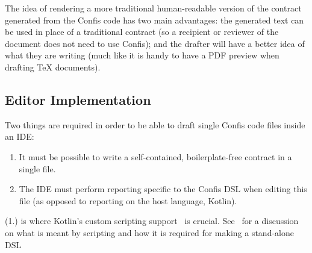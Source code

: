The idea of rendering a more traditional human-readable version of the contract generated from the Confis code has two main advantages: the generated text can be used in place of a traditional contract (so a recipient or reviewer of the document does not need to use Confis);
and the drafter will have a better idea of what they are writing (much like it is handy to have a PDF preview when drafting TeX documents).

\subsection{Editor Implementation}\label{subsec:editor-implementation}

Two things are required in order to be able to draft single Confis code files inside an IDE:
\begin{enumerate}
    \item It must be possible to write a self-contained, boilerplate-free contract in a single file.
    \item The IDE must perform reporting specific to the Confis DSL when editing this file (as opposed to reporting on the host language, Kotlin).
\end{enumerate}

(1.) is where Kotlin's custom scripting support~\cite{kotlinScriptKeep} is crucial.
See~ for a discussion on what is meant by scripting and how it is required for making a stand-alone DSL

